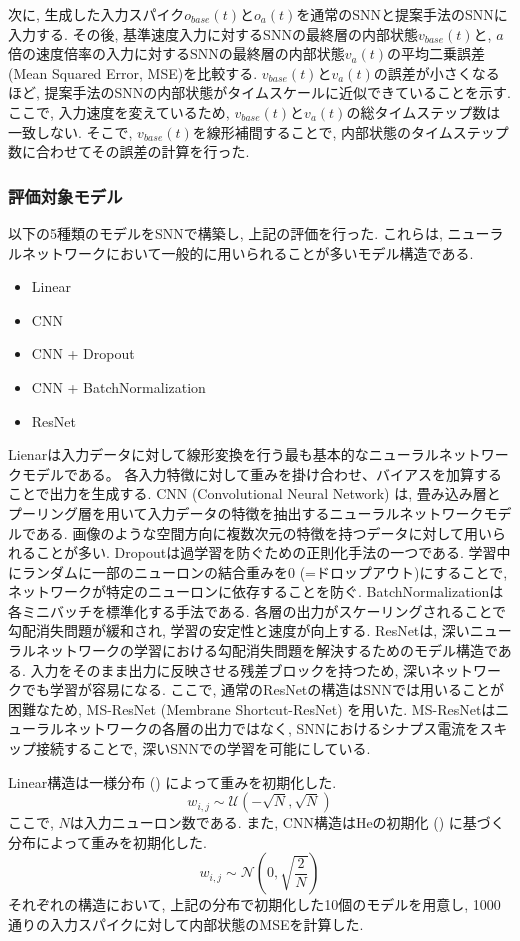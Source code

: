 次に, 生成した入力スパイク$o_{base}(t)$と$o_a(t)$を通常のSNNと提案手法のSNNに入力する.
その後, 基準速度入力に対するSNNの最終層の内部状態$v_{base}(t)$と, $a$倍の速度倍率の入力に対するSNNの最終層の内部状態$v_a(t)$の平均二乗誤差 (Mean Squared Error, MSE)を比較する.
$v_{base}(t)$と$v_a(t)$の誤差が小さくなるほど, 提案手法のSNNの内部状態がタイムスケールに近似できていることを示す.
ここで, 入力速度を変えているため, $v_{base}(t)$と$v_a(t)$の総タイムステップ数は一致しない.
そこで, $v_{base}(t)$を線形補間することで, 内部状態のタイムステップ数に合わせてその誤差の計算を行った.

\subsubsection{評価対象モデル}
以下の5種類のモデルをSNNで構築し, 上記の評価を行った.
これらは, ニューラルネットワークにおいて一般的に用いられることが多いモデル構造である.
\begin{itemize}
    \item Linear
    \item CNN
    \item CNN + Dropout
    \item CNN + BatchNormalization
    \item ResNet
\end{itemize}
Lienarは入力データに対して線形変換を行う最も基本的なニューラルネットワークモデルである。
各入力特徴に対して重みを掛け合わせ、バイアスを加算することで出力を生成する.
CNN (Convolutional Neural Network) は, 畳み込み層とプーリング層を用いて入力データの特徴を抽出するニューラルネットワークモデルである.
画像のような空間方向に複数次元の特徴を持つデータに対して用いられることが多い.
Dropoutは過学習を防ぐための正則化手法の一つである.
学習中にランダムに一部のニューロンの結合重みを0 (=ドロップアウト)にすることで, ネットワークが特定のニューロンに依存することを防ぐ.
BatchNormalizationは各ミニバッチを標準化する手法である.
各層の出力がスケーリングされることで勾配消失問題が緩和され, 学習の安定性と速度が向上する.
ResNetは, 深いニューラルネットワークの学習における勾配消失問題を解決するためのモデル構造である.
入力をそのまま出力に反映させる残差ブロックを持つため, 深いネットワークでも学習が容易になる.
ここで, 通常のResNetの構造はSNNでは用いることが困難なため, MS-ResNet (Membrane Shortcut-ResNet)\cite{msresnet} を用いた.
MS-ResNetはニューラルネットワークの各層の出力ではなく, SNNにおけるシナプス電流をスキップ接続することで, 深いSNNでの学習を可能にしている.

Linear構造は一様分布 () によって重みを初期化した.
\begin{equation}
    w_{i,j} \sim \mathcal{U}\left(-\sqrt{N}, \sqrt{N}\right) \label{eq:uniform:distribution}
\end{equation}
ここで, $N$は入力ニューロン数である.
また, CNN構造はHeの初期化 () に基づく分布によって重みを初期化した.
\begin{equation}
    w_{i,j} \sim \mathcal{N}\left(0, \sqrt{\frac{2}{N}}\right) \label{eq:he:initialization}
\end{equation}
それぞれの構造において, 上記の分布で初期化した10個のモデルを用意し, 1000通りの入力スパイクに対して内部状態のMSEを計算した.

